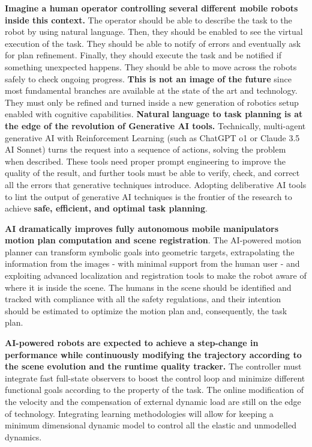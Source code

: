 \textbf{Imagine a human operator controlling several different mobile
robots inside this context.} The operator should be able to describe the
task to the robot by using natural language. Then, they should be
enabled to see the virtual execution of the task. They should be able to
notify of errors and eventually ask for plan refinement. Finally, they
should execute the task and be notified if something unexpected happens.
They should be able to move across the robots safely to check ongoing
progress. \textbf{This is not an image of the future} since most
fundamental branches are available at the state of the art and
technology. They must only be refined and turned inside a new generation
of robotics setup enabled with cognitive capabilities. \textbf{Natural
language to task planning is at the edge of the revolution of Generative
AI tools.} Technically, multi-agent generative AI with Reinforcement
Learning (such as ChatGPT o1 or Claude 3.5 AI Sonnet) turns the request
into a sequence of actions, solving the problem when described. These
tools need proper prompt engineering to improve the quality of the
result, and further tools must be able to verify, check, and correct all
the errors that generative techniques introduce. Adopting deliberative
AI tools to lint the output of generative AI techniques is the frontier
of the research to achieve \textbf{safe, efficient, and optimal task
planning}.

\textbf{AI dramatically improves fully autonomous mobile
manipulators\textquotesingle{} motion plan computation and scene
registration}. The AI-powered motion planner can transform symbolic
goals into geometric targets, extrapolating the information from the
images - with minimal support from the human user - and exploiting
advanced localization and registration tools to make the robot aware of
where it is inside the scene. The humans in the scene should be
identified and tracked with compliance with all the safety regulations,
and their intention should be estimated to optimize the motion plan and,
consequently, the task plan.

\textbf{AI-powered robots are expected to achieve a step-change in
performance while continuously modifying the trajectory according to the
scene evolution and the runtime quality tracker.} The controller must
integrate fast full-state observers to boost the control loop and
minimize different functional goals according to the property of the
task. The online modification of the velocity and the compensation of
external dynamic load are still on the edge of technology. Integrating
learning methodologies will allow for keeping a minimum dimensional
dynamic model to control all the elastic and unmodelled dynamics.

